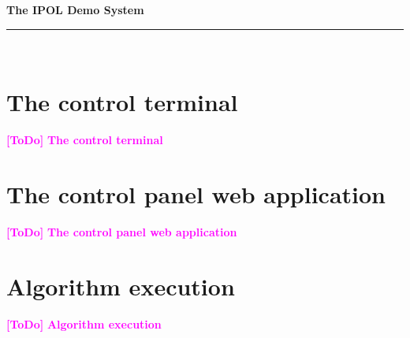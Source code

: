 \documentclass[a4paper,12pt]{article}
\newcommand{\ToDo}[1]{\textcolor{magenta}{\textbf{[ToDo]} \textbf{#1}}}
\begin{document}
\begin{titlepage}

\begin{center}
\vspace*{-1in}

\vspace*{0.6in}
\begin{Large}
\textbf{The IPOL Demo System} \\
\end{Large}
\vspace*{0.6in}
\rule{80mm}{0.1mm}\\
\vspace*{0.1in}
\end{center}

\end{titlepage}

\newpage

\tableofcontents
\newpage
\listoffigures
\newpage











\section{The control terminal}
\ToDo{The control terminal}

\section{The control panel web application}
\ToDo{The control panel web application}

\section{Algorithm execution}
\ToDo{Algorithm execution}
\end{document}
